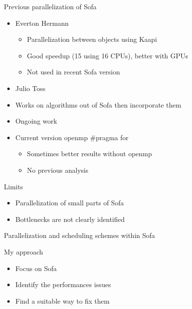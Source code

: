 \documentclass[xcolor={usenames,dvipsnames}]{beamer}
\begin{document}
\begin{frame}{Previous parallelization of Sofa}
    \begin{itemize}[<+->]
        \item Everton Hermann \citep{Hermann10Simulations} \\
            \begin{itemize}
                \item Parallelization between objects using Kaapi
                \item Good speedup (15 using 16 CPUs), better with GPUs
                \item Not used in recent Sofa version 
            \end{itemize}
        \item Julio Toss \citep{Toss12New}
        \item Works on algorithms out of Sofa then incorporate them
        \item Ongoing work
        \item Current version openmp \#pragma for
            \begin{itemize}
                \item Sometimes better results without openmp
                \item No previous analysis
            \end{itemize}
    \end{itemize}
    \pause
    \begin{alertblock}{Limits}
        \begin{itemize}
            \item Parallelization of small parts of Sofa
            \item Bottlenecks are not clearly identified
        \end{itemize}
    \end{alertblock}
\end{frame}
\begin{frame}{Parallelization and scheduling schemes within Sofa}

    \begin{alertblock}{My approach}
        \begin{itemize}
            \item Focus on Sofa 
            \item \alert{Identify the performances issues}
            \item Find a suitable way to fix them
        \end{itemize}
    \end{alertblock}
\end{frame}
\end{document}
